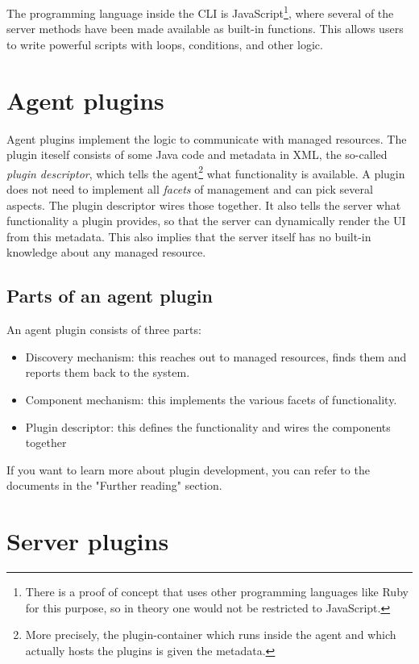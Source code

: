 \documentclass[twocolumn,10pt,a4paper]{article}
\begin{document}
The programming language inside the CLI is JavaScript\footnote{There is 
a proof of concept that uses other programming languages like Ruby for this 
purpose, so in theory one would not be restricted to JavaScript.}, where 
several of the server methods have been made available as built-in functions. 
This allows users to write powerful scripts with loops, conditions, and other logic.

\section{Agent plugins}

Agent plugins implement the logic to communicate with managed resources.
The plugin iteself consists of some Java code and metadata in XML, the 
so-called \emph{plugin descriptor}, which tells the agent\footnote{More precisely, 
the plugin-container which runs inside the agent and which actually 
hosts the plugins is given the metadata.} what functionality is 
available. A plugin does not need to implement all \emph{facets} of 
management and can pick several aspects. The plugin descriptor 
wires those together. It also tells the server what functionality 
a plugin provides, so that the server can dynamically render the 
UI from this metadata. This also implies that the server itself 
has no built-in knowledge about any managed resource.

\subsection{Parts of an agent plugin}

An agent plugin consists of three parts:
\begin{itemize}
\item Discovery mechanism: this reaches out to managed resources, finds them and reports them back to the system.
\item Component mechanism: this implements the various facets of functionality.
\item Plugin descriptor: this defines the functionality and wires the components together
\end{itemize}

If you want to learn more about plugin development, you can refer to the documents in the "Further reading" section.

\section{Server plugins}
\end{document}
